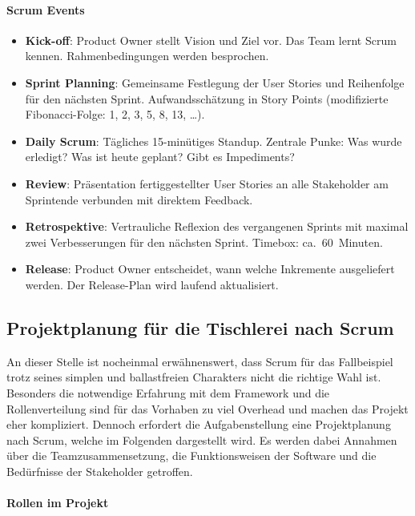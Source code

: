 \documentclass[
    a4paper,
    11pt,
    bibliography=totoc,
    listof=totoc,
    parskip=half,
    headings=normal
]{scrbook}
\begin{document}
\paragraph{Scrum Events}
\begin{itemize}[noitemsep]
      \item \textbf{Kick-off}: Product Owner stellt Vision und Ziel vor. Das Team lernt
            Scrum kennen. Rahmenbedingungen werden besprochen.
      \item \textbf{Sprint Planning}: Gemeinsame Festlegung der User Stories und
            Reihenfolge für den nächsten Sprint. Aufwandsschätzung in Story Points
            (modifizierte Fibonacci-Folge: 1, 2, 3, 5, 8, 13, \dots)\autocite[vgl.][Kap.~3]{Reppin2020}.
      \item \textbf{Daily Scrum}: Tägliches 15-minütiges Standup. Zentrale Punke: Was wurde erledigt?
            Was ist heute geplant? Gibt es Impediments?
      \item \textbf{Review}: Präsentation fertiggestellter User Stories an alle
            Stakeholder am Sprintende verbunden mit direktem Feedback.
      \item \textbf{Retrospektive}: Vertrauliche Reflexion des vergangenen Sprints mit
            maximal zwei Verbesserungen für den nächsten Sprint.
            Timebox: ca.\ 60~Minuten\autocite[vgl.][Kap.~3]{Reppin2020}.
      \item \textbf{Release}: Product Owner entscheidet, wann welche Inkremente
            ausgeliefert werden. Der Release-Plan wird laufend aktualisiert.
\end{itemize}

\subsection{Projektplanung für die Tischlerei nach Scrum}
An dieser Stelle ist nocheinmal erwähnenswert, dass Scrum für das Fallbeispiel trotz seines simplen und ballastfreien Charakters nicht die richtige Wahl ist. Besonders die notwendige Erfahrung mit dem Framework und die Rollenverteilung sind für das Vorhaben zu viel Overhead und machen das Projekt eher kompliziert. Dennoch erfordert die Aufgabenstellung eine Projektplanung nach Scrum, welche im Folgenden dargestellt wird. Es werden dabei Annahmen über die Teamzusammensetzung, die Funktionsweisen der Software und die Bedürfnisse der Stakeholder getroffen.

\paragraph{Rollen im Projekt}
\end{document}
